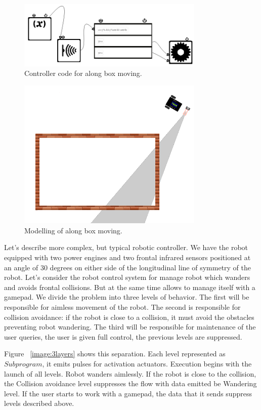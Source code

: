 \documentclass[conference,compsoc]{IEEEtran}
\begin{document}
\begin{figure}[ht]
	\centering
	\includegraphics[width=3.5in]{alongBoxCode.png}
	\caption{Controller code for along box moving.}
	\label{image:boxC}
\end{figure}

\begin{figure}[ht]
	\centering
	\includegraphics[width=3.5in]{alongBoxModel.png}
	\caption{Modelling of along box moving.}
	\label{image:box}
\end{figure}

Let's describe more complex, but typical robotic controller. We have the robot equipped with two power engines and two frontal infrared sensors positioned at an angle of 30 degrees on either side of the longitudinal line of symmetry of the robot. Let's consider the robot control system for manage robot which wanders and avoids frontal collisions. But at the same time allows to manage itself with a gamepad. We divide the problem into three levels of behavior. The first will be responsible for aimless movement of the robot. The second is responsible for collision avoidance: if the robot is close to a collision, it must avoid the obstacles preventing robot wandering. The third will be responsible for maintenance of the user queries, the user is given full control, the previous levels are suppressed.

Figure ~\ref{image:3layers} shows this separation. Each level represented as $Subprogram$, it emits pulses for activation actuators. Execution begins with the launch of all levels. Robot wanders aimlessly. If the robot is close to the collision, the Collision avoidance level suppresses the flow with data emitted be Wandering level. If the user starts to work with a gamepad, the data that it sends suppress levels described above.
\end{document}
